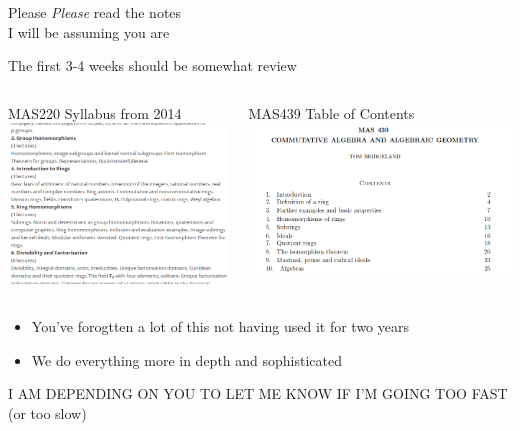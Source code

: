 \documentclass{beamer}
\begin{document}
\begin{frame}[plain,c]

\begin{center}

\Huge

Please \emph{Please} read the notes \\
I will be assuming you are
\end{center}

\end{frame}




\begin{frame}{The first 3-4 weeks should be somewhat review}

\begin{columns}
\begin{block}{MAS220 Syllabus from 2014}
 \includegraphics[width=.9\linewidth]{MAS220}
\end{block}
\begin{block}{MAS439 Table of Contents}
\includegraphics[width=.9\linewidth]{TOC}
\end{block}
\end{columns}
\begin{itemize}
\item You've forogtten a lot of this not having used it for two years
\item We do everything more in depth and sophisticated
\end{itemize}
\alert{I AM DEPENDING ON YOU TO LET ME KNOW IF I'M GOING TOO FAST} (or too slow)

\end{frame}
\end{document}
